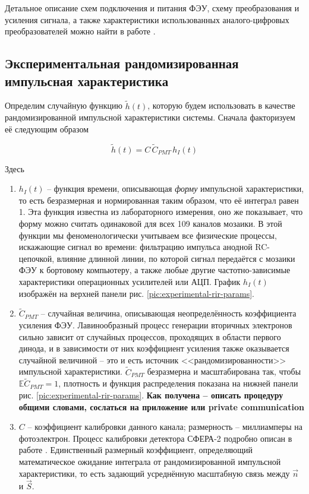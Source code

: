 \documentclass[12pt]{book}
\begin{document}
	Детальное описание схем подключения и питания ФЭУ, схему преобразования и усиления сигнала, а также характеристики использованных аналого-цифровых преобразователей можно найти в работе \cite{SphereDetector2020}.
	
	\subsection{Экспериментальная рандомизированная импульсная характеристика}

	Определим случайную функцию $\tilde{h}(t)$, которую будем использовать в качестве рандомизированной импульсной характеристики системы. Сначала факторизуем её следующим образом
	
	\begin{equation}
		\label{eq:experimental-rir}
		\tilde{h}(t) = C \, \tilde{C}_{PMT} \, h_I(t)
	\end{equation}

	Здесь
	
	\begin{enumerate}
		\item $h_I(t)$ -- функция времени, описывающая \textit{форму} импульсной характеристики, то есть безразмерная и нормированная таким образом, что её интеграл равен 1. Эта функция известна из лабораторного измерения, оно же показывает, что форму можно считать одинаковой для всех 109 каналов мозаики. В этой функции мы феноменологически учитываем все физические процессы, искажающие сигнал во времени: фильтрацию импульса анодной RC-цепочкой, влияние длинной линии, по которой сигнал передаётся с мозаики ФЭУ к бортовому компьютеру, а также любые другие частотно-зависимые характеристики операционных усилителей или АЦП. График $h_I(t)$ изображён на верхней панели рис. \ref{pic:experimental-rir-params}.
		\item $\tilde{C}_{PMT}$ -- случайная величина, описывающая неопределённость коэффициента усиления ФЭУ. Лавинообразный процесс генерации вторичных электронов сильно зависит от случайных процессов, проходящих в области первого динода, и в зависимости от них коэффициент усиления также оказывается случайной величиной -- это и есть источник <<рандомизированности>> импульсной характеристики. $\tilde{C}_{PMT}$ безразмерна и масштабирована так, чтобы $\mathbb{E} \tilde{C}_{PMT} = 1$, плотность и функция распределения показана на нижней панели рис. \ref{pic:experimental-rir-params}. \textbf{Как получена -- описать процедуру общими словами, сослаться на приложение или private communication}
		\item $C$ -- коэффициент калибровки данного канала; размерность -- миллиамперы на фотоэлектрон. Процесс калибровки детектора СФЕРА-2 подробно описан в работе \cite{SphereCalibration2016}. Единственный размерный коэффициент, определяющий математическое ожидание интеграла от рандомизированной импульсной характеристики, то есть задающий усреднённую масштабную связь между $\vec{n}$ и $\vec{S}$.
	\end{enumerate}
\end{document}
